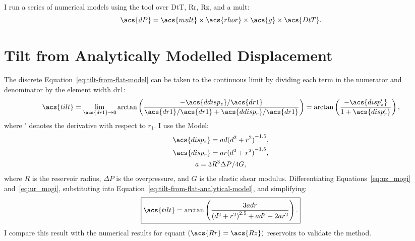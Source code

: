 I run a series of numerical models using the  tool over \ac{DtT}, \ac{Rr}, \ac{Rz}, and a \ac{mult}:
\begin{equation}
    \acs{dP}=\acs{mult}\times\acs{rhor}\times\acs{g}\times\acs{DtT}.
\end{equation}

\section{Tilt from Analytically Modelled Displacement}
The discrete Equation~\eqref{eq:tilt-from-flat-model} can be taken to the continuous limit by dividing each term in the numerator and denominator by the element width \acs{dr1}:
\begin{equation}
\acs{tilt}
    = \lim_{\acs{dr1}\to0} 
    \arctan\left(\dfrac{-\acs{ddisp_z}/\acs{dr1}}{\acs{dr1}/\acs{dr1}
    + \acs{ddisp_r}/\acs{dr1}}\right) = 
    \arctan\left(\dfrac{-\acs{disp_z'}}{1+\acs{disp_r'}}\right),\label{eq:tilt-from-flat-analytical-model}
\end{equation}
where $'$ denotes the derivative with respect to $r_1$. I use the \textcite{mogi_relations_1958} Model:
\begin{gather}
    \acs{disp_z} = ad{(d^2+r^2)}^{-1.5},\label{eq:uz_mogi}\\
    \acs{disp_r} = ar{(d^2+r^2)}^{-1.5},\label{eq:ur_mogi}\\
    a = {3R^3\Delta P}/{4G},\nonumber
\end{gather}
where $R$ is the reservoir radius, $\Delta P$ is the overpressure, and $G$ is the elastic shear modulus. Differentiating Equations~\eqref{eq:uz_mogi} and~\eqref{eq:ur_mogi}, substituting into Equation~\eqref{eq:tilt-from-flat-analytical-model}, and simplifying:
\begin{equation}
    \boxed{\acs{tilt} = \arctan\left(\frac{3adr}{{(d^2+r^2)}^{2.5}+ad^2-2ar^2}\right).}\label{eq:tilt-from-mogi-model}
\end{equation}
I compare this result with the numerical results for equant $(\acs{Rr}=\acs{Rz})$ reservoirs to validate the method.